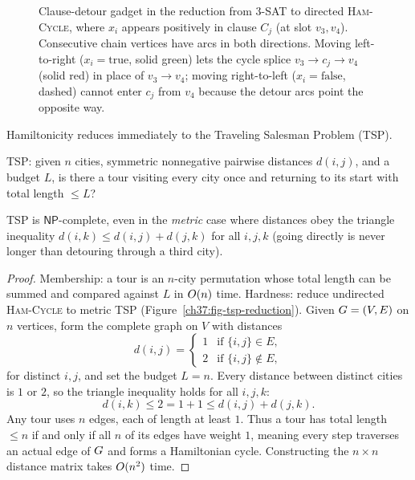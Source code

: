 \begin{figure}[htbp]
\caption{Clause-detour gadget in the reduction from \textsc{3-SAT} to directed \textsc{Ham-Cycle}, where $x_i$ appears positively in clause $C_j$ (at slot $v_3,v_4$). Consecutive chain vertices have arcs in both directions. Moving left-to-right ($x_i=\text{true}$, solid green) lets the cycle splice $v_3 \to c_j \to v_4$ (solid red) in place of $v_3\to v_4$; moving right-to-left ($x_i=\text{false}$, dashed) cannot enter $c_j$ from $v_4$ because the detour arcs point the opposite way.}
\label{ch37:fig-ham}
\end{figure}

Hamiltonicity reduces immediately to the Traveling Salesman Problem (\textsc{TSP}).

\begin{definition}
\label{ch37:def-tsp}
\textsc{TSP}: given $n$ cities, symmetric nonnegative pairwise distances $d(i,j)$, and a budget $L$, is
there a tour visiting every city once and returning to its start with total length $\le L$?
\end{definition}

\begin{theorem}
\label{ch37:thm-tsp}
\textsc{TSP} is $\mathsf{NP}$-complete, even in the \emph{metric} case where
distances obey the triangle inequality $d(i,k)\le d(i,j)+d(j,k)$ for all $i,j,k$ (going directly is never longer than detouring through a third city).
\end{theorem}

\begin{proof}
Membership: a tour is an $n$-city permutation whose total length can be summed and compared against $L$ in $O(n)$ time. Hardness: reduce undirected \textsc{Ham-Cycle} to metric \textsc{TSP} (Figure~\ref{ch37:fig-tsp-reduction}). Given $G=(V,E)$ on $n$ vertices, form the complete graph on $V$ with distances
\[
  d(i,j)=\begin{cases} 1 & \text{if } \{i,j\}\in E,\\ 2 & \text{if } \{i,j\}\notin E,\end{cases}
\]
for distinct $i,j$, and set the budget $L=n$. Every distance between distinct cities is $1$ or $2$, so the triangle inequality holds for all $i,j,k$:
\[
  d(i,k) \le 2 = 1 + 1 \le d(i,j) + d(j,k).
\]
Any tour uses $n$ edges, each of length at least $1$. Thus a tour has total length $\le n$ if and only if all $n$ of its edges have weight $1$, meaning every step traverses an actual edge of $G$ and forms a Hamiltonian cycle. Constructing the $n\times n$ distance matrix takes $O(n^2)$ time.
\end{proof}

